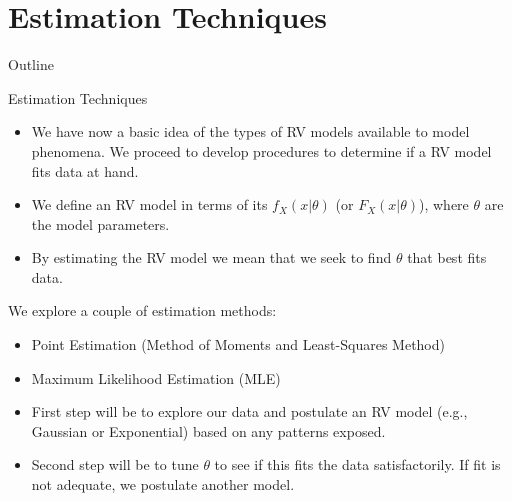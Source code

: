 \documentclass[handout,9pt]{beamer}
\begin{document}
\section{Estimation Techniques}
\begin{frame}{Outline}
\tableofcontents[currentsection]
\end{frame}

%
\begin{frame}{Estimation Techniques}


\begin{itemize}
\setlength{\itemsep}{5pt}
\item We have now a basic idea of the types of RV models available to model phenomena. We proceed to develop procedures to determine if a RV model fits data at hand. 

\item We define an RV model in terms of its $f_X(x|\theta)$ (or $F_X(x|\theta)$), where $\theta$ are the model parameters. 

\item By estimating the RV model we mean that we seek to find $\theta$ that best fits data.

\end{itemize}

\begin{block}{}
We explore a couple of estimation methods:
\begin{itemize}
\item Point Estimation (Method of Moments and Least-Squares Method)

\item Maximum Likelihood Estimation (MLE)
\end{itemize}
\end{block}

\begin{itemize}
 \setlength{\itemsep}{5pt}
\item First step will be to explore our data and postulate an RV model (e.g., Gaussian or Exponential) based on any patterns exposed. 
\item Second step will be to tune $\theta$ to see if this fits the data satisfactorily. If fit is not adequate, we postulate another model.
\end{itemize}

\end{frame}
\end{document}
